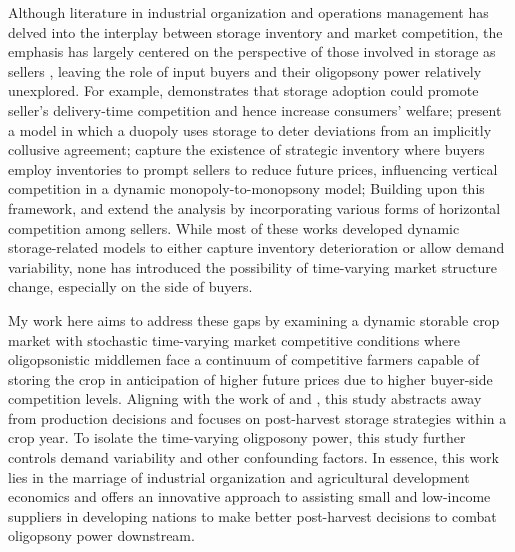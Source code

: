 Although literature in industrial organization and operations management has delved into the interplay between storage inventory and market competition, the emphasis has largely centered on the perspective of those involved in storage as sellers \citep{leng2005game}, leaving the role of input buyers and their oligopsony power relatively unexplored. For example, \cite{li1992role} demonstrates that storage adoption could promote seller's delivery-time competition and hence increase consumers' welfare; \cite{rotemberg1989cyclical} present a model in which a duopoly uses storage to deter deviations from an implicitly collusive agreement; \cite{anand2008strategic} capture the existence of strategic inventory where buyers employ inventories to prompt sellers to reduce future prices, influencing vertical competition in a dynamic monopoly-to-monopsony model; Building upon this framework, \cite{hu2021strategic} and \cite{cai2021supply} extend the analysis by incorporating various forms of horizontal competition among sellers. While most of these works developed dynamic storage-related models to either capture inventory deterioration or allow demand variability, none has introduced the possibility of time-varying market structure change, especially on the side of buyers. 



My work here aims to address these gaps by examining a dynamic storable crop market with stochastic time-varying market competitive conditions where oligopsonistic middlemen face a continuum of competitive farmers capable of storing the crop in anticipation of higher future prices due to higher buyer-side competition levels. Aligning with the work of \cite{porteous2019high} and \cite{ruhinduka2020smallholder}, this study abstracts away from production decisions and focuses on post-harvest storage strategies within a crop year. To isolate the time-varying oligposony power, this study further controls demand variability and other confounding factors. In essence, this work lies in the marriage of industrial organization and agricultural development economics \citep{bellemare2022agricultural} and offers an innovative approach to assisting small and low-income suppliers in developing nations to make better post-harvest decisions to combat oligopsony power downstream.






